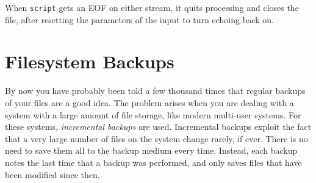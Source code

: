 
When \texttt{script} gets an EOF on either stream, it quits processing
and closes the file, after resetting the parameters of the input to
turn echoing back on. 


\section{Filesystem Backups}

By now you have probably been told a few thousand times that regular
backups of your files are a good idea. The problem
arises when you are dealing with a system with a large amount of file
storage, like modern multi-user systems. For these systems,
\textit{incremental backups} are used. Incremental backups exploit the
fact that a very large number of files on the system change rarely, if
ever. There is no need to save them all to the backup medium every
time. Instead, each backup notes the last time that a backup was
performed, and only saves files that have been modified since then. 

